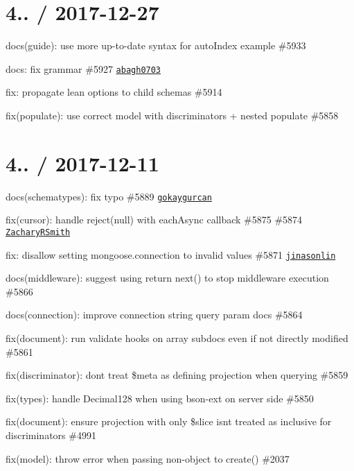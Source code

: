\section*{4.. / 2017-\/12-\/27 }


\begin{DoxyItemize}
\item docs(guide)\+: use more up-\/to-\/date syntax for auto\+Index example \#5933
\item docs\+: fix grammar \#5927 \href{https://github.com/abagh0703}{\tt abagh0703}
\item fix\+: propagate lean options to child schemas \#5914
\item fix(populate)\+: use correct model with discriminators + nested populate \#5858
\end{DoxyItemize}

\section*{4.. / 2017-\/12-\/11 }


\begin{DoxyItemize}
\item docs(schematypes)\+: fix typo \#5889 \href{https://github.com/gokaygurcan}{\tt gokaygurcan}
\item fix(cursor)\+: handle {\ttfamily reject(null)} with each\+Async callback \#5875 \#5874 \href{https://github.com/ZacharyRSmith}{\tt Zachary\+R\+Smith}
\item fix\+: disallow setting {\ttfamily mongoose.\+connection} to invalid values \#5871 \href{https://github.com/jinasonlin}{\tt jinasonlin}
\item docs(middleware)\+: suggest using {\ttfamily return next()} to stop middleware execution \#5866
\item docs(connection)\+: improve connection string query param docs \#5864
\item fix(document)\+: run validate hooks on array subdocs even if not directly modified \#5861
\item fix(discriminator)\+: don\textquotesingle{}t treat \$meta as defining projection when querying \#5859
\item fix(types)\+: handle Decimal128 when using bson-\/ext on server side \#5850
\item fix(document)\+: ensure projection with only \$slice isn\textquotesingle{}t treated as inclusive for discriminators \#4991
\item fix(model)\+: throw error when passing non-\/object to create() \#2037
\end{DoxyItemize}

